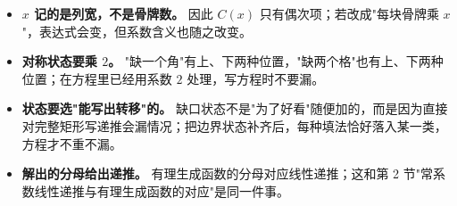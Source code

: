 \begin{itemize}
\item \textbf{$x$ 记的是列宽，不是骨牌数。} 因此 $C(x)$ 只有偶次项；若改成"每块骨牌乘 $x$"，表达式会变，但系数含义也随之改变。
\item \textbf{对称状态要乘 $2$。} "缺一个角"有上、下两种位置，"缺两个格"也有上、下两种位置；在方程里已经用系数 $2$ 处理，写方程时不要漏。
\item \textbf{状态要选"能写出转移"的。} 缺口状态不是"为了好看"随便加的，而是因为直接对完整矩形写递推会漏情况；把边界状态补齐后，每种填法恰好落入某一类，方程才不重不漏。
\item \textbf{解出的分母给出递推。} 有理生成函数的分母对应线性递推；这和第 2 节"常系数线性递推与有理生成函数的对应"是同一件事。
\end{itemize}
